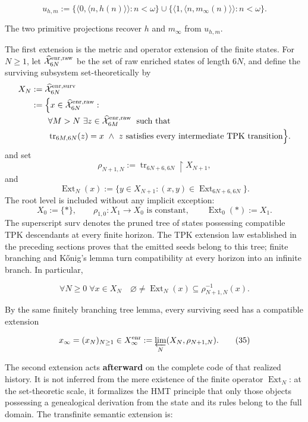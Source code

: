 \[
 u_{h,m}:=
 \{\langle0,\langle n,h(n)\rangle\rangle:n<\omega\}
 \cup
 \{\langle1,\langle n,m_\infty(n)\rangle\rangle:n<\omega\}.
\tag{33a}\label{hmtfg:base:eq:ch-codigo-conjunto}
\]

The two primitive projections recover \(h\) and \(m_\infty\) from
\(u_{h,m}\).

The first extension is the metric and operator extension of the finite states.
For \(N\ge1\), let \(\widehat{\mathcal X}^{\rm enr,raw}_{6N}\) be the set of
raw enriched states of length \(6N\), and define the surviving subsystem
set-theoretically by
\[
\begin{aligned}
 X_N
 &:=\widehat{\mathcal X}^{\rm enr,surv}_{6N}\\
 &:=\Bigl\{x\in\widehat{\mathcal X}^{\rm enr,raw}_{6N}:\\[-.2ex]
 &\qquad\forall M>N\ \exists z\in
   \widehat{\mathcal X}^{\rm enr,raw}_{6M}\;\text{ such that}\\[-.2ex]
 &\qquad\operatorname{tr}_{6M,6N}(z)=x\ \wedge\
   z\text{ satisfies every intermediate TPK transition}\Bigr\}.
\end{aligned}
\]
and set
\[
 \rho_{N+1,N}:=\operatorname{tr}_{6N+6,6N}\!\upharpoonright X_{N+1},
\]
and
\[
 \operatorname{Ext}_N(x):=
 \{y\in X_{N+1}:(x,y)\in
 \operatorname{Ext}_{6N+6,6N}\}.
\]
The root level is included without any implicit exception:
\[
 X_0:=\{\ast\},\qquad
 \rho_{1,0}:X_1\to X_0\text{ is constant},\qquad
 \operatorname{Ext}_0(\ast):=X_1.
\]
The superscript \(\mathrm{surv}\) denotes the pruned tree of states possessing
compatible TPK descendants at every finite horizon. The TPK extension law
established in the preceding sections proves that the emitted seeds belong to
this tree; finite branching and Kőnig's lemma turn compatibility at every
horizon into an infinite branch. In particular,

\[
 \forall N\ge0\;\forall x\in X_N\quad
 \varnothing\ne\operatorname{Ext}_N(x)
 \subseteq\rho_{N+1,N}^{-1}(x).
\tag{34}\label{hmtfg:base:eq:ch-extension-no-vacia}
\]

By the same finitely branching tree lemma, every surviving seed has a
compatible extension

\[
 x_\infty=(x_N)_{N\ge1}\in
 X_\infty^{\rm enr}:=\varprojlim_N(X_N,\rho_{N+1,N}).
\tag{35}\label{hmtfg:base:eq:ch-limite-inverso}
\]

The second extension acts \textbf{afterward} on the complete code of that
realized history.
It is not inferred from the mere existence of the finite operator
\(\operatorname{Ext}_N\): at the set-theoretic scale, it formalizes the HMT principle that
only those objects possessing a genealogical derivation
from the state and its rules belong to the full domain. The transfinite semantic
extension is:

